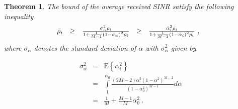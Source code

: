 \documentclass[a4paper,10pt,fleqn, twocolumn]{IEEEtran}
\newtheorem{theorem}{Theorem}
\begin{document}
\begin{theorem} The bound of the average received SINR satisfy the
following inequality
\begin{equation}\hspace{-0.10in}
\begin{array}{rcccl}
\bar\rho_{i}&\geq& \frac{\sigma_{\alpha}^{2}\rho_{i}}{1+
\frac{1}{M-1}\left(1-\sigma_{\alpha}\right)^{2}\rho_{i}}&\geq&
\frac{\bar\alpha_{i}^{2}\rho_{i}}{1+
\frac{1}{M-1}\left(1-\bar\alpha_{i}\right)^{2}\rho_{i}}\ ,
\end{array}
\end{equation}
\noindent where  $\sigma_{\alpha}$ denotes the standard deviation
of $\alpha$ with $\sigma_{\alpha}^2$ given by

\begin{equation}
\begin{array}{rcl}
\sigma_{\alpha}^2&=&\mbox{E}\left\{\alpha_{i}^2\right\}\\
&=&\int\limits_{1}^{\alpha_{0}}\frac{\left(2M-2\right)\alpha^3\left(1-\alpha^2\right)^{M-2}}{\left(1-\alpha_{0}^{2}\right)^{M-1}}d\alpha\\
&=&\frac{1}{M}+\frac{M-1}{M}\alpha_{0}^2\ .
\end{array}
\end{equation}


\end{theorem}
\begin{figure}
\end{figure}
\end{document}
